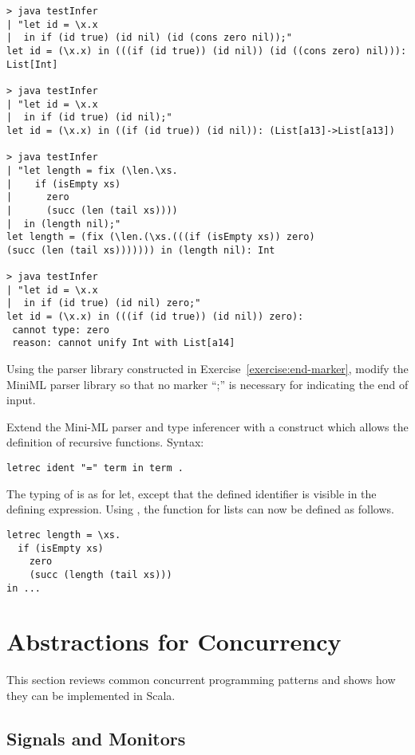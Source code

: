 {\begin{lstlisting}
> java testInfer 
| "let id = \x.x  
|  in if (id true) (id nil) (id (cons zero nil));"
let id = (\x.x) in (((if (id true)) (id nil)) (id ((cons zero) nil))): List[Int]

> java testInfer
| "let id = \x.x 
|  in if (id true) (id nil);"
let id = (\x.x) in ((if (id true)) (id nil)): (List[a13]->List[a13])

> java testInfer
| "let length = fix (\len.\xs.
|    if (isEmpty xs) 
|      zero 
|      (succ (len (tail xs))))
|  in (length nil);"
let length = (fix (\len.(\xs.(((if (isEmpty xs)) zero) 
(succ (len (tail xs))))))) in (length nil): Int

> java testInfer 
| "let id = \x.x 
|  in if (id true) (id nil) zero;"
let id = (\x.x) in (((if (id true)) (id nil)) zero): 
 cannot type: zero
 reason: cannot unify Int with List[a14]
\end{lstlisting}

\begin{exercise}\label{exercise:hm-parse} Using the parser library constructed in
Exercise~\ref{exercise:end-marker}, modify the MiniML parser library
so that no marker ``;'' is necessary for indicating the end of input.
\end{exercise}

\begin{exercise}\label{execcise:hm-extend} Extend the Mini-ML parser and type
inferencer with a  construct which allows the definition of
recursive functions. Syntax:
\begin{lstlisting}
letrec ident "=" term in term .
\end{lstlisting}
The typing of  is as for {let}, 
except that the defined identifier is visible in the defining expression. Using , the  function for lists can now be defined as follows.
\begin{lstlisting}
letrec length = \xs.
  if (isEmpty xs)
    zero
    (succ (length (tail xs)))
in ...
\end{lstlisting}
\end{exercise}

\chapter{Abstractions for Concurrency}\label{sec:ex-concurrency}

This section reviews common concurrent programming patterns and shows
how they can be implemented in Scala.

\section{Signals and Monitors}

}
